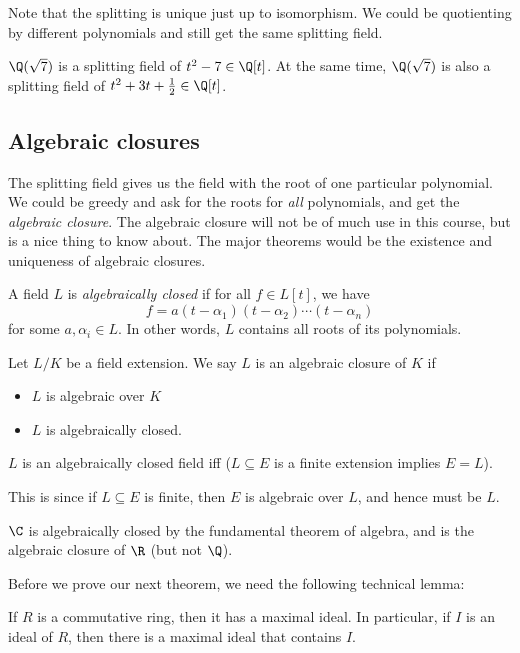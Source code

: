 \documentclass[a4paper]{article}
\begin{document}
Note that the splitting is unique just up to isomorphism. We could be quotienting by different polynomials and still get the same splitting field.
\begin{eg}
  $\Q(\sqrt{7})$ is a splitting field of $t^2 - 7\in \Q[t]$. At the same time, $\Q(\sqrt{7})$ is also a splitting field of $t^2 + 3t + \frac{1}{2} \in \Q[t]$.
\end{eg}
\subsection{Algebraic closures}
The splitting field gives us the field with the root of one particular polynomial. We could be greedy and ask for the roots for \emph{all} polynomials, and get the \emph{algebraic closure}. The algebraic closure will not be of much use in this course, but is a nice thing to know about. The major theorems would be the existence and uniqueness of algebraic closures.

\begin{defi}
  A field $L$ is \emph{algebraically closed} if for all $f\in L[t]$, we have
  \[
    f = a(t - \alpha_1)(t - \alpha_2) \cdots (t - \alpha_n)
  \]
  for some $a, \alpha_i \in L$. In other words, $L$ contains all roots of its polynomials.

  Let $L/K$ be a field extension. We say $L$ is an algebraic closure of $K$ if
  \begin{itemize}
    \item $L$ is algebraic over $K$
    \item $L$ is algebraically closed.
  \end{itemize}
\end{defi}

\begin{eg}
  $L$ is an algebraically closed field iff ($L\subseteq E$ is a finite extension implies $E = L$).

  This is since if $L \subseteq E$ is finite, then $E$ is algebraic over $L$, and hence must be $L$.
\end{eg}

\begin{eg}
  $\C$ is algebraically closed by the fundamental theorem of algebra, and is the algebraic closure of $\R$ (but not $\Q$).
\end{eg}

Before we prove our next theorem, we need the following technical lemma:
\begin{lemma}
  If $R$ is a commutative ring, then it has a maximal ideal. In particular, if $I$ is an ideal of $R$, then there is a maximal ideal that contains $I$.
\end{lemma}
\end{document}
